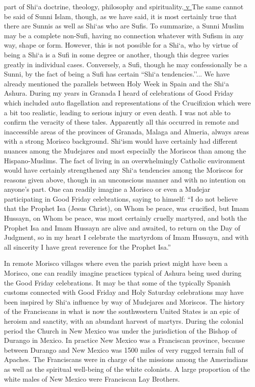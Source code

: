 part of Shi`a doctrine, theology, philosophy and spirituality.\hyperref[_edn5]{ v } The same cannot be said of Sunni Islam, though, as we have said, it is most certainly true that there are Sunnis as well as Shi`as who are Sufis. To summarize, a Sunni Muslim may be a complete non-Sufi, having no connection whatever with Sufism in any way, shape or form. However, this is not possible for a Shi`a, who by virtue of being a Shi`a is a Sufi in some degree or another, though this degree varies greatly in individual cases. Conversely, a Sufi, though he may confessionally be a Sunni, by the fact of being a Sufi has certain ``Shi`a tendencies.''... We have already mentioned the parallels between Holy Week in Spain and the Shi`a Ashura. During my years in Granada I heard of celebrations of Good Friday which included auto flagellation and representations of the Crucifixion which were a bit too realistic, leading to serious injury or even death. I was not able to confirm the veracity of these tales. Apparently all this occurred in remote and inaccessible areas of the provinces of Granada, Malaga and Almeria, always areas with a strong Morisco background. Shi`ism would have certainly had different nuances among the Mudejares and most especially the Moriscos than among the Hispano-Muslims. The fact of living in an overwhelmingly Catholic environment would have certainly strengthened any Shi`a tendencies among the Moriscos for reasons given above, though in an unconscious manner and with no intention on anyone's part. One can readily imagine a Morisco or even a Mudejar participating in Good Friday celebrations, saying to himself: ``I do not believe that the Prophet Isa (Jesus Christ), on Whom be peace, was crucified, but Imam Hussayn, on Whom be peace, was most certainly cruelly martyred, and both the Prophet Isa and Imam Hussayn are alive and awaited, to return on the Day of Judgment, so in my heart I celebrate the martyrdom of Imam Hussayn, and with all sincerity I have great reverence for the Prophet Isa.''

In remote Morisco villages where even the parish priest might have been a Morisco, one can readily imagine practices typical of Ashura being used during the Good Friday celebrations. It may be that some of the typically Spanish customs connected with Good Friday and Holy Saturday celebrations may have been inspired by Shi`a influence by way of Mudejares and Moriscos. The history of the Franciscans in what is now the southwestern United States is an epic of heroism and sanctity, with an abundant harvest of martyrs. During the colonial period the Church in New Mexico was under the jurisdiction of the Bishop of Durango in Mexico. In practice New Mexico was a Franciscan province, because between Durango and New Mexico was 1500 miles of very rugged terrain full of Apaches. The Franciscans were in charge of the missions among the Amerindians as well as the spiritual well-being of the white colonists. A large proportion of the white males of New Mexico were Franciscan Lay Brothers.

